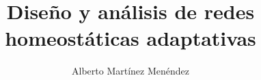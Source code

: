 \documentclass[a4paper,12pt,twoside,hidelinks,openany]{report}
\begin{document}
\title{Diseño y análisis de redes homeostáticas adaptativas}
\author{Alberto Martínez Menéndez}

\pagebreak
\cleardoublepage
\baselineskip 19pt

\renewcommand{\labelitemi}{$-$}
\renewcommand{\tablename}{Tabla}

\renewcommand{\appendixname}{Anexos}
\renewcommand{\appendixtocname}{Anexos}
\renewcommand{\appendixpagename}{Anexos}





\cleardoublepage


\newpage

\newpage
\cleardoublepage

\newpage


\cleardoublepage
\renewcommand{\contentsname}{Índice}
\tableofcontents

\newpage
\renewcommand\listfigurename{Lista de Figuras}
\listoffigures

\newpage
\renewcommand\listtablename{Lista de Tablas}
\listoftables












\nocite{*}




\newpage
\appendix
\clearpage
\addappheadtotoc
\appendixpage







\end{document}
